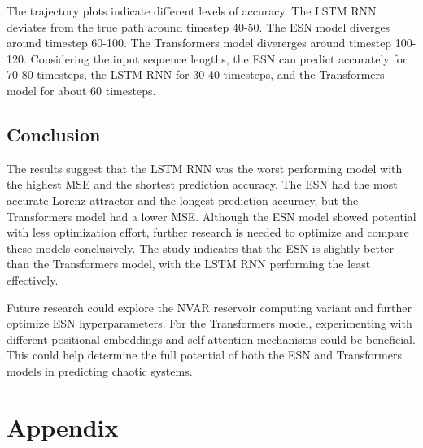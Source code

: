 \documentclass[11pt]{article}
\begin{document}
The trajectory plots indicate different levels of accuracy. The LSTM RNN deviates from the true path around timestep 40-50. The ESN model diverges around timestep 60-100. The Transformers model divererges around timestep 100-120. Considering the input sequence lengths, the ESN can predict accurately for 70-80 timesteps, the LSTM RNN for 30-40 timesteps, and the Transformers model for about 60 timesteps.

\subsection{Conclusion}
The results suggest that the LSTM RNN was the worst performing model with the highest MSE and the shortest prediction accuracy. The ESN had the most accurate Lorenz attractor and the longest prediction accuracy, but the Transformers model had a lower MSE. Although the ESN model showed potential with less optimization effort, further research is needed to optimize and compare these models conclusively. The study indicates that the ESN is slightly better than the Transformers model, with the LSTM RNN performing the least effectively.

Future research could explore the NVAR reservoir computing variant and further optimize ESN hyperparameters. For the Transformers model, experimenting with different positional embeddings and self-attention mechanisms could be beneficial. This could help determine the full potential of both the ESN and Transformers models in predicting chaotic systems.

\appendix
\section*{Appendix}
\end{document}

